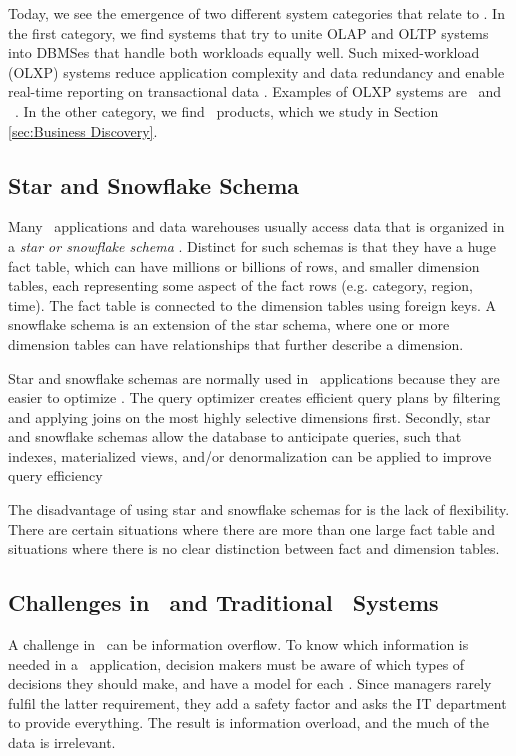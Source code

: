 Today, we see the emergence of two different system categories that relate to \bi. In the first category, we find systems that try to unite OLAP and OLTP systems into DBMSes that handle both workloads equally well. Such mixed-workload (OLXP) systems reduce application complexity and data redundancy and enable real-time reporting on transactional data \cite{Plattner2014-fr}. Examples of OLXP systems are \hyper~and \hyrise~\cite{Kemper2011-ap, Schwalb2014-hn}. In the other category, we find \bd~products, which we study in Section \ref{sec:Business Discovery}.


\subsection{Star and Snowflake Schema}
\label{sub:Star and Snowflake Schema}
Many \bi~applications and data warehouses usually access data that is organized in a \textit{star or snowflake schema} \cite{Barber2012-xt}. Distinct for such schemas is that they have a huge fact table, which can have millions or billions of rows, and smaller dimension tables, each representing some aspect of the fact rows (e.g. category, region, time). The fact table is connected to the dimension tables using foreign keys. A snowflake schema is an extension of the star schema, where one or more dimension tables can have relationships that further describe a dimension.

Star and snowflake schemas are normally used in \bi~applications because they are easier to optimize \cite{Lamb2012-kg}. The query optimizer creates efficient query plans by filtering and applying joins on the most highly selective dimensions first. Secondly, star and snowflake schemas allow the database to anticipate queries, such that indexes, materialized views, and/or denormalization can be applied to improve query efficiency \cite{Barber2012-xt}

The disadvantage of using star and snowflake schemas for \bi is the lack of flexibility. There are certain situations where there are more than one large fact table and situations where there is no clear distinction between fact and dimension tables.

\subsection{Challenges in \bi~and Traditional \bi~Systems} 
\label{sub:Challenges in Business Intelligence and Traditional Business Intelligence Systems}
A challenge in \bi~can be information overflow. To know which information is needed in a \bi~application, decision makers must be aware of which types of decisions they should make, and have a model for each \cite{Ackoff1999-wk}. Since managers rarely fulfil the latter requirement, they add a safety factor and asks the IT department to provide everything. The result is information overload, and the much of the data is irrelevant. 

